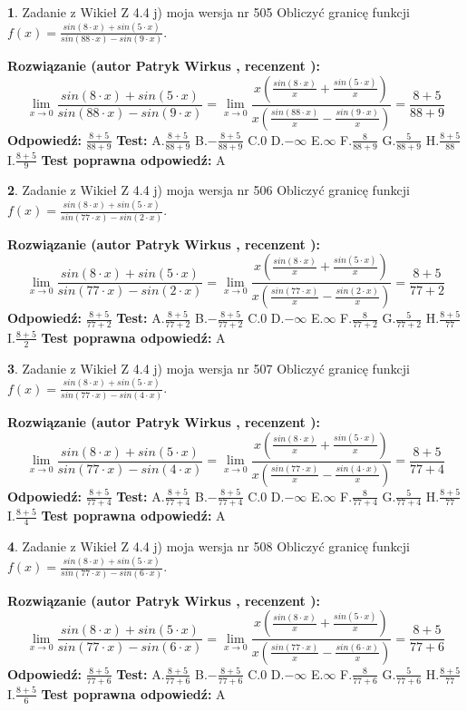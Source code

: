 \documentclass[12pt, a4paper]{article}
\theoremstyle{definition} %
\newtheorem{zad}{}
\newcommand{\zadStart}[1]{\begin{zad}#1\newline}
\newcommand{\zadStop}{\end{zad}}
\newcommand{\rozwStart}[2]{\noindent \textbf{Rozwiązanie (autor #1 , recenzent #2): }\newline}
\newcommand{\rozwStop}{\newline}
\newcommand{\odpStart}{\noindent \textbf{Odpowiedź:}\newline}
\newcommand{\odpStop}{\newline}
\newcommand{\testStart}{\noindent \textbf{Test:}\newline}
\newcommand{\testStop}{\newline}
\newcommand{\kluczStart}{\noindent \textbf{Test poprawna odpowiedź:}\newline}
\newcommand{\kluczStop}{\newline}
\begin{document}
\zadStart{Zadanie z Wikieł Z 4.4 j) moja wersja nr 505}
Obliczyć granicę funkcji $f(x)=\frac{sin(8\cdot x) +sin(5\cdot x)}{sin(88\cdot x) -sin(9\cdot x)}$.
\zadStop
\rozwStart{Patryk Wirkus}{}
$$\lim\limits_{x\to 0}\frac{sin(8\cdot x) +sin(5\cdot x)}{sin(88\cdot x) -sin(9\cdot x)}=\lim\limits_{x\to 0}\frac{x(\frac{sin(8\cdot x)}{x}+\frac{sin(5\cdot x)}{x})}{x(\frac{sin(88\cdot x)}{x}-\frac{sin(9\cdot x)}{x})}=\frac{8+5}{88+9}$$
\rozwStop
\odpStart
$\frac{8+5}{88+9}$
\odpStop
\testStart
A.$\frac{8+5}{88+9}$
B.$-\frac{8+5}{88+9}$
C.$0$
D.$-\infty$
E.$\infty$
F.$\frac{8}{88+9}$
G.$\frac{5}{88+9}$
H.$\frac{8+5}{88}$
I.$\frac{8+5}{9}$
\testStop
\kluczStart
A
\kluczStop



\zadStart{Zadanie z Wikieł Z 4.4 j) moja wersja nr 506}
Obliczyć granicę funkcji $f(x)=\frac{sin(8\cdot x) +sin(5\cdot x)}{sin(77\cdot x) -sin(2\cdot x)}$.
\zadStop
\rozwStart{Patryk Wirkus}{}
$$\lim\limits_{x\to 0}\frac{sin(8\cdot x) +sin(5\cdot x)}{sin(77\cdot x) -sin(2\cdot x)}=\lim\limits_{x\to 0}\frac{x(\frac{sin(8\cdot x)}{x}+\frac{sin(5\cdot x)}{x})}{x(\frac{sin(77\cdot x)}{x}-\frac{sin(2\cdot x)}{x})}=\frac{8+5}{77+2}$$
\rozwStop
\odpStart
$\frac{8+5}{77+2}$
\odpStop
\testStart
A.$\frac{8+5}{77+2}$
B.$-\frac{8+5}{77+2}$
C.$0$
D.$-\infty$
E.$\infty$
F.$\frac{8}{77+2}$
G.$\frac{5}{77+2}$
H.$\frac{8+5}{77}$
I.$\frac{8+5}{2}$
\testStop
\kluczStart
A
\kluczStop



\zadStart{Zadanie z Wikieł Z 4.4 j) moja wersja nr 507}
Obliczyć granicę funkcji $f(x)=\frac{sin(8\cdot x) +sin(5\cdot x)}{sin(77\cdot x) -sin(4\cdot x)}$.
\zadStop
\rozwStart{Patryk Wirkus}{}
$$\lim\limits_{x\to 0}\frac{sin(8\cdot x) +sin(5\cdot x)}{sin(77\cdot x) -sin(4\cdot x)}=\lim\limits_{x\to 0}\frac{x(\frac{sin(8\cdot x)}{x}+\frac{sin(5\cdot x)}{x})}{x(\frac{sin(77\cdot x)}{x}-\frac{sin(4\cdot x)}{x})}=\frac{8+5}{77+4}$$
\rozwStop
\odpStart
$\frac{8+5}{77+4}$
\odpStop
\testStart
A.$\frac{8+5}{77+4}$
B.$-\frac{8+5}{77+4}$
C.$0$
D.$-\infty$
E.$\infty$
F.$\frac{8}{77+4}$
G.$\frac{5}{77+4}$
H.$\frac{8+5}{77}$
I.$\frac{8+5}{4}$
\testStop
\kluczStart
A
\kluczStop



\zadStart{Zadanie z Wikieł Z 4.4 j) moja wersja nr 508}
Obliczyć granicę funkcji $f(x)=\frac{sin(8\cdot x) +sin(5\cdot x)}{sin(77\cdot x) -sin(6\cdot x)}$.
\zadStop
\rozwStart{Patryk Wirkus}{}
$$\lim\limits_{x\to 0}\frac{sin(8\cdot x) +sin(5\cdot x)}{sin(77\cdot x) -sin(6\cdot x)}=\lim\limits_{x\to 0}\frac{x(\frac{sin(8\cdot x)}{x}+\frac{sin(5\cdot x)}{x})}{x(\frac{sin(77\cdot x)}{x}-\frac{sin(6\cdot x)}{x})}=\frac{8+5}{77+6}$$
\rozwStop
\odpStart
$\frac{8+5}{77+6}$
\odpStop
\testStart
A.$\frac{8+5}{77+6}$
B.$-\frac{8+5}{77+6}$
C.$0$
D.$-\infty$
E.$\infty$
F.$\frac{8}{77+6}$
G.$\frac{5}{77+6}$
H.$\frac{8+5}{77}$
I.$\frac{8+5}{6}$
\testStop
\kluczStart
A
\kluczStop
\end{document}
